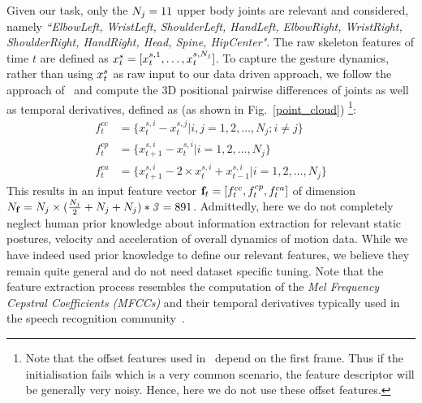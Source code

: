 Given our task, only  the $N_j=11$ upper body joints are relevant and
considered, namely \emph{``ElbowLeft, WristLeft, ShoulderLeft, HandLeft, ElbowRight, WristRight, ShoulderRight, HandRight, Head, Spine, HipCenter"}.
%
The raw skeleton features of time $t$ are defined as $x^s_t=[x_t^{s,1}, \ldots, x_t^{s, N_j}]$.
To capture the gesture dynamics, rather than using $x^s_t$ as raw input to our data driven approach,
we follow the approach of~\cite{diwucvpr14} and compute the 3D positional pairwise differences of joints as well as temporal derivatives, defined as (as shown in Fig.~\ref{point_cloud}) \footnote{Note that the offset features used in~\cite{diwucvpr14} depend on the first frame.
Thus if the initialisation fails which is a very common scenario, the feature descriptor will be generally very noisy.
Hence, here we do not use these offset features.}:
\begin{align}
f^{cc}_t&=\{x_t^{s,i}-x_t^{s,j} | i,j=1,2,\ldots, N_j; i\neq j\} \label{sk_features_1}\\
f^{cp}_t&=\{x_{t+1}^{s,i}-x_t^{s,i} |  i=1,2,\ldots, N_j\} \label{sk_features_2}\\
f^{ca}_t&=\{x_{t+1}^{s,i} - 2 \times x_t^{s,i} + x_{t-1}^{s,i} | i=1,2,\ldots, N_j  \} \label{sk_features_3}
\end{align}
%
This results in an input feature vector $\mathbf{f}_t=[f^{cc}_t, f^{cp}_t, f^{ca}_t]$ of dimension $N_{\mathbf{f}}=N_j \times( \frac{ N_j}{2} + N_j + N_j)*\mathit{3}=891$.
Admittedly, here we do not completely neglect human prior knowledge about information extraction for relevant static postures, velocity and acceleration of overall dynamics of motion data.
While we have indeed used prior knowledge to define our relevant features, we believe they remain quite general and do not need dataset specific tuning.
Note that the feature extraction process resembles the computation of the
\emph{Mel Frequency Cepstral Coefficients (MFCCs)} and their temporal derivatives
typically used in the  speech recognition community~\cite{mohamed2012acoustic}.


